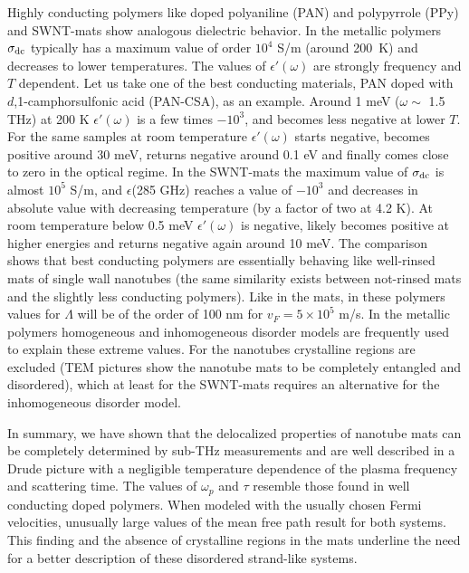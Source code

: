 \begin{multicols}{2}
Highly conducting polymers like doped polyaniline (PAN) and
polypyrrole (PPy)\cite{Lee95,Kohlman97} and SWNT-mats show analogous
dielectric behavior. In the metallic polymers $\sigma_{\rm dc}$ typically has
a maximum value of order $10^4$ S/m (around 200~K) and decreases to lower
temperatures.  The values of $\epsilon'(\omega)$ are strongly frequency and
$T$ dependent.  Let us take one of the best conducting materials, PAN doped
with $d$,1-camphorsulfonic acid (PAN-CSA), as an example\cite{Kohlman97}.
Around 1 meV ($\omega \sim $ 1.5 THz) at 200 K $\epsilon'(\omega)$ is a few
times $-10^3$, and becomes less negative at lower $T$. For the same samples
at room temperature $\epsilon'(\omega)$ starts negative, becomes positive
around 30 meV, returns negative around 0.1 eV and finally comes close to zero
in the optical regime.  In the SWNT-mats the maximum value of $\sigma_{\rm
dc}$ is almost $10^5$ S/m, and $\epsilon$(285 GHz) reaches a value of $-10^3$
and decreases in absolute value with decreasing temperature (by a factor of
two at 4.2 K). At room temperature below 0.5 meV $\epsilon'(\omega)$ is
negative, likely becomes positive at higher energies and returns negative
again around 10 meV\cite{Ugawa99,note1,Chapman99}.  The comparison shows that
best conducting polymers are essentially behaving like well-rinsed mats of
single wall nanotubes (the same similarity exists between not-rinsed mats and
the slightly less conducting polymers).
Like in the mats, in these polymers values for $\Lambda$ will be of the order
of 100 nm for $v_F = 5 \times 10^5$ m/s\cite{Kohlman97}. In the metallic
polymers homogeneous and inhomogeneous disorder
models\cite{Kohlman97,Chapman99} are frequently used to explain these extreme
values. For the nanotubes crystalline regions are excluded (TEM pictures show
the nanotube mats to be completely entangled and disordered), which  at least
for the SWNT-mats requires an alternative for the inhomogeneous disorder
model.

In summary, we have shown that the delocalized properties of nanotube mats
can be completely determined by sub-THz measurements and are well described
in a Drude picture with a negligible temperature dependence of the plasma
frequency and scattering time.  The values of $\omega_p$ and $\tau$ resemble
those found in well conducting doped polymers.  When modeled with the usually
chosen Fermi velocities, unusually large values of the mean free path result
for both systems. This finding and the absence of crystalline regions in the
mats underline the need for a better description of these disordered
strand-like systems.



\end{multicols}

